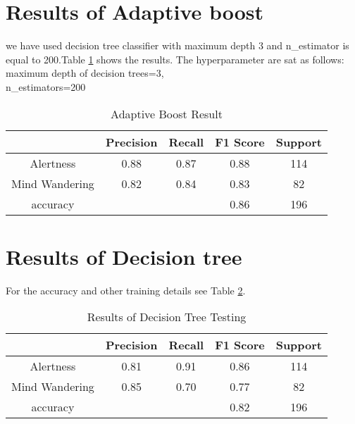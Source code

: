 \section{Results of Adaptive boost  }
we have used decision tree classifier with maximum depth 3 and n\_estimator is equal to 200.Table \ref{tab:adaboost_res} shows the results.
The hyperparameter are sat as follows:\\
maximum depth of decision trees=3,\\
n\_estimators=200\\
\begin{table}[ht]
    \centering
    \caption{Adaptive Boost Result}
    {\renewcommand{\arraystretch}{1.2}
    \begin{tabular}{ccccc}
            \hline
            \hline
             & Precision & Recall & F1 Score & Support \\ 
            \hline
              Alertness   & 0.88 & 0.87 & 0.88 & 114  \\
              Mind Wandering   & 0.82 & 0.84 & 0.83 & 82 \\
              accuracy &  &  & 0.86 & 196 \\
              \hline
              \hline
        \end{tabular}
    }
    
    \label{tab:adaboost_res}
\end{table}

\section{Results of Decision tree}
For the accuracy and other training details see Table \ref{tab:decison_tree_res}.
\begin{center}
    \begin{table}[ht]
    \centering
    \caption{Results of Decision Tree Testing}
    {\renewcommand{\arraystretch}{1.2}
    \begin{tabular}{ccccc}
       \hline
       \hline
         & Precision & Recall & F1 Score & Support \\
        \hline
          
         Alertness      & 0.81   &   0.91     & 0.86     &  114 \\
         Mind Wandering      & 0.85   &   0.70     & 0.77      &  82 \\
    accuracy      &        &           & 0.82     &  196 \\
 
          \hline
          \hline
    \end{tabular}
    }
    \label{tab:decison_tree_res}
\end{table}
\end{center}


